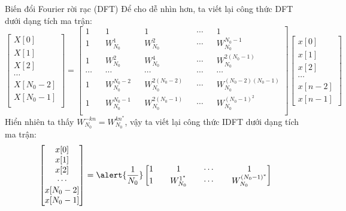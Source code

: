 \documentclass[8pt]{beamer}
\begin{document}
\begin{frame}{Biến đổi Fourier rời rạc (DFT)}
Để cho dễ nhìn hơn, ta viết lại công thức DFT dưới dạng tích ma trận:
\begin{equation*}
	\begin{bmatrix}
		X[0]\\
		X[1]\\
		X[2]\\
		\cdots\\
		X[N_{0}-2]\\
		X[N_{0}-1]\\
	\end{bmatrix}
	=
	\begin{bmatrix}
		1&&1&&1&&\cdots&&1\\
		1&&W_{N_{0}}^{1}&&W_{N_{0}}^{2}&&\cdots&&W_{N_{0}}^{N_{0}-1}\\
		1&&W_{N_{0}}^{2}&&W_{N_{0}}^{4}&&\cdots&&W_{N_{0}}^{2(N_{0}-1)}\\
		\cdots&&\cdots&&\cdots&&\cdots&&\cdots\\
		1&&W_{N_{0}}^{N_{0}-2}&&W_{N_{0}}^{2(N_{0}-2)}&&\cdots&& W_{N_{0}}^{(N_{0}-2)(N_{0}-1)}\\
		1&&W_{N_{0}}^{N_{0}-1}&&W_{N_{0}}^{2(N_{0}-1)}&&\cdots&&W_{N_{0}}^{(N_{0}-1)^2}\\
	\end{bmatrix}
	\begin{bmatrix}
		x[0]\\x[1]\\x[2]\\ \cdots\\x[n-2]\\x[n-1]
	\end{bmatrix}
\end{equation*}
Hiển nhiên ta thấy $W_{N_{0}}^{-kn}=W_{N_{0}}^{kn^{*}}$, vậy ta viết lại công thức IDFT dưới dạng tích ma trận:
\begin{equation*}
	\begin{bmatrix}
		x[0]\\
		x[1]\\
		x[2]\\
		\cdots\\
		x[N_{0}-2]\\
		x[N_{0}-1]\\
	\end{bmatrix}
	=\alert{\frac{1}{N_{0}}}
	\begin{bmatrix}
		1&&1&&\cdots&&1\\
		1&&W_{N_{0}}^{1^*}&&\cdots&&W_{N_{0}}^{(N_{0}-1)^*}\\

\end{bmatrix}
\end{equation*}
\end{frame}
\end{document}
